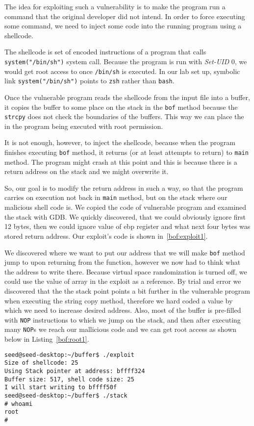 \documentclass[12pt, a4paper, pdflatex]{article}
\begin{document}
The idea for exploiting such a vulnerability is to make the program run a command that the original developer did not intend. In order to force executing some command, we need to inject some code into the running program using a shellcode. 

The shellcode is set of encoded instructions of a program that calls \texttt{system("/bin/sh")} system call. Because the program is run with \emph{Set-UID} 0, we would get root access to once \texttt{/bin/sh} is executed. In our lab set up, symbolic link \texttt{system("/bin/sh")} points to \texttt{zsh} rather than \texttt{bash}.

Once the vulnerable program reads the shellcode from the input file into a buffer, it copies the buffer to some place on the stack in the \texttt{bof} method because the \texttt{strcpy} does not check the boundaries of the buffers. This way we can place the in the program being executed with root permission.

It is not enough, however, to inject the shellcode, because when the program finishes executing \texttt{bof} method, it returns (or at least attempts to return) to \texttt{main} method. The program might crash at this point and this is because there is a return address on the stack and we might overwrite it.

So, our goal is to modify the return address in such a way, so that the program carries on execution not back in \texttt{main} method, but on the stack where our malicious shell code is. We copied the code of vulnerable program and examined the stack with GDB. We quickly discovered, that we could obviously ignore first 12 bytes, then we could ignore value of ebp register and what next four bytes was stored return address. Our exploit's code is shown in~\ref{bof:exploit1}. 

We discovered where we want to put our address that we will make \texttt{bof} method jump to upon returning from the function, however we now had to think what the address to write there. Because virtual space randomization is turned off, we could use the value of  array in the exploit as a reference. By trial and error we discovered that the the stack point points a bit further in the vulnerable program when executing the string copy method, therefore we hard coded a value by which we need to increase desired address. Also, most of the buffer is pre-filled with \texttt{NOP} instructions to which we jump on the stack, and then after executing many \texttt{NOP}s we reach our mallicious code and we can get root access as shown below in Listing~\ref{bof:root1}.
\vspace{1em}
\lstset{
	captionpos=b,
	frame=single,
	language=BASH,
	breaklines=true,
	caption=Function with buffer overflow vulnerability,
	label=bof:root1,
}
\begin{lstlisting}
seed@seed-desktop:~/buffer$ ./exploit 
Size of shellcode: 25
Using Stack pointer at address: bffff324
Buffer size: 517, shell code size: 25
I will start writing to bffff50f
seed@seed-desktop:~/buffer$ ./stack 
# whoami                                                                       
root
# 
\end{lstlisting}
\end{document}
